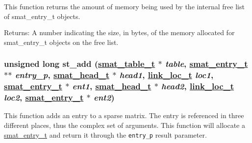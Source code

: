 This function returns the amount of memory being used by the internal free list of smat\_\-entry\_\-t objects.

\begin{Desc}
\item[Returns:]A number indicating the size, in bytes, of the memory allocated for smat\_\-entry\_\-t objects on the free list. \end{Desc}
\hypertarget{group__dbprim__smat_a10}{
\subsubsection[st\_\-add]{\setlength{\rightskip}{0pt plus 5cm}unsigned long st\_\-add (\hyperlink{dbprim_8h_a0}{smat\_\-table\_\-t} $\ast$ {\em table}, \hyperlink{dbprim_8h_a2}{smat\_\-entry\_\-t} $\ast$$\ast$ {\em entry\_\-p}, \hyperlink{dbprim_8h_a1}{smat\_\-head\_\-t} $\ast$ {\em head1}, \hyperlink{dbprim_8h_a4}{link\_\-loc\_\-t} {\em loc1}, \hyperlink{dbprim_8h_a2}{smat\_\-entry\_\-t} $\ast$ {\em ent1}, \hyperlink{dbprim_8h_a1}{smat\_\-head\_\-t} $\ast$ {\em head2}, \hyperlink{dbprim_8h_a4}{link\_\-loc\_\-t} {\em loc2}, \hyperlink{dbprim_8h_a2}{smat\_\-entry\_\-t} $\ast$ {\em ent2})}}
\label{group__dbprim__smat_a10}


This function adds an entry to a sparse matrix. The entry is referenced in three different places, thus the complex set of arguments. This function will allocate a \hyperlink{group__dbprim__smat_a2}{smat\_\-entry\_\-t} and return it through the {\tt entry\_\-p} result parameter.

